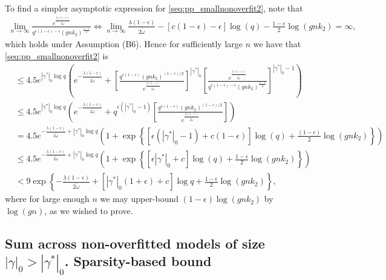 To find a simpler asymptotic expression for \eqref{seq:pp_smallnonoverfit2}, note that
\begin{align}
\lim_{n \rightarrow \infty} \frac{ e^{\frac{\underline{\lambda}(1-\epsilon)}{2 \tilde{\omega}}} }{q^{c(1-\epsilon)-\epsilon} (gnk_2)^{\frac{1-\epsilon}{2}}}
\Leftrightarrow
\lim_{n \rightarrow \infty}
\frac{\underline{\lambda}(1-\epsilon)}{2 \tilde{\omega}} - [c(1-\epsilon)-\epsilon] \log(q) - \frac{1-\epsilon}{2} \log(gnk_2)= \infty,
\nonumber
\end{align}
which holds under Assumption (B6).
Hence for sufficiently large $n$ we have that \eqref{seq:pp_smallnonoverfit2} is
\begin{align}
&\leq 4.5 e^{|\gamma^*|_0 \log q}
\left( e^{-\frac{\underline{\lambda}(1-\epsilon)}{2 \tilde{\omega}}}
+ \left[ \frac{q^{c(1-\epsilon)} (gnk_2)^{(1-\epsilon)/2}}{ e^{\frac{\underline{\lambda}(1-\epsilon)}{2 \tilde{\omega}}} } \right]^{|\gamma^*|_0}
\left[ \frac{ e^{\frac{\underline{\lambda}(1-\epsilon)}{2 \tilde{\omega}}} }{q^{c(1-\epsilon)-\epsilon} (gnk_2)^{\frac{1-\epsilon}{2}}} \right]^{|\gamma^*|_0-1}
 \right)
\nonumber \\
&\leq 4.5 e^{|\gamma^*|_0 \log q}
\left( e^{-\frac{\underline{\lambda}(1-\epsilon)}{2 \tilde{\omega}}}
+ 
q^{\epsilon (|\gamma^*|_0-1)}
\left[ \frac{q^{c(1-\epsilon)} (gnk_2)^{(1-\epsilon)/2}}{ e^{\frac{\underline{\lambda}(1-\epsilon)}{2 \tilde{\omega}}} } \right] \right)
\nonumber \\
&= 4.5 e^{-\frac{\underline{\lambda}(1-\epsilon)}{2 \tilde{\omega}} + |\gamma^*|_0 \log q}
\left( 1
+ 
\exp \left\{ [\epsilon (|\gamma^*|_0-1) + c(1-\epsilon)] \log(q) + \frac{(1-\epsilon)}{2} \log(gnk_2) \right\}
\right)
\nonumber \\
&\leq 4.5 e^{-\frac{\underline{\lambda}(1-\epsilon)}{2 \tilde{\omega}} + |\gamma^*|_0 \log q}
\left( 1
+ 
\exp \left\{ [\epsilon |\gamma^*|_0 + c] \log(q) + \frac{1-\epsilon}{2} \log(gnk_2) \right\}
\right)
\nonumber \\
&
< 9 \exp \left\{  -\frac{\underline{\lambda}(1-\epsilon)}{2 \tilde{\omega}} + [|\gamma^*|_0(1+\epsilon) + c] \log q + \frac{1-\epsilon}{2} \log(gnk_2) \right\},
\nonumber
\end{align}
where for large enough $n$ we may upper-bound $(1-\epsilon)\log(gnk_2)$ by $\log(gn)$, as we wished to prove.



\subsection{Sum across non-overfitted models of size $|\gamma|_0 > |\gamma^*|_0$. Sparsity-based bound}


